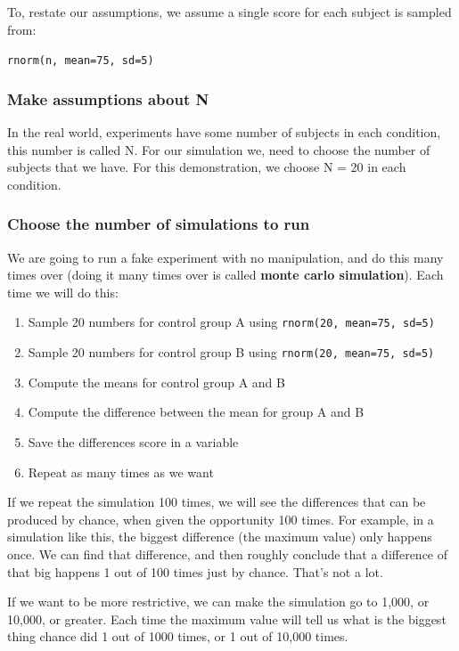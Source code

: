 \documentclass[]{book}
\providecommand{\tightlist}{%
  \setlength{\itemsep}{0pt}\setlength{\parskip}{0pt}}
\begin{document}
To, restate our assumptions, we assume a single score for each subject
is sampled from:

\texttt{rnorm(n,\ mean=75,\ sd=5)}

\subsubsection{Make assumptions about N}\label{make-assumptions-about-n}

In the real world, experiments have some number of subjects in each
condition, this number is called N. For our simulation we, need to
choose the number of subjects that we have. For this demonstration, we
choose N = 20 in each condition.

\subsubsection{Choose the number of simulations to
run}\label{choose-the-number-of-simulations-to-run}

We are going to run a fake experiment with no manipulation, and do this
many times over (doing it many times over is called \textbf{monte carlo
simulation}). Each time we will do this:

\begin{enumerate}
\def\labelenumi{\arabic{enumi}.}
\tightlist
\item
  Sample 20 numbers for control group A using
  \texttt{rnorm(20,\ mean=75,\ sd=5)}
\item
  Sample 20 numbers for control group B using
  \texttt{rnorm(20,\ mean=75,\ sd=5)}
\item
  Compute the means for control group A and B
\item
  Compute the difference between the mean for group A and B
\item
  Save the differences score in a variable
\item
  Repeat as many times as we want
\end{enumerate}

If we repeat the simulation 100 times, we will see the differences that
can be produced by chance, when given the opportunity 100 times. For
example, in a simulation like this, the biggest difference (the maximum
value) only happens once. We can find that difference, and then roughly
conclude that a difference of that big happens 1 out of 100 times just
by chance. That's not a lot.

If we want to be more restrictive, we can make the simulation go to
1,000, or 10,000, or greater. Each time the maximum value will tell us
what is the biggest thing chance did 1 out of 1000 times, or 1 out of
10,000 times.
\end{document}
